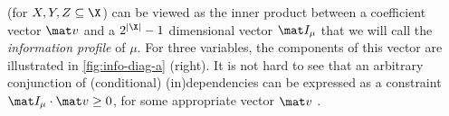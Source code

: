 (for $X,Y,Z \subseteq \X$)
can be viewed as the inner product between a coefficient vector $\mat v$
and a $2^{|\X|}-1$ dimensional vector $\mat I_\mu$ that we will call the \emph{information profile} of $\mu$. For three variables, the components of this vector are illustrated in 
\cref{fig:info-diag-a} (right).
%
It is not hard to see that an arbitrary conjunction of (conditional) (in)dependencies 
can be expressed as
a constraint $\mat I_\mu \cdot \mat v \ge 0$, for 
some appropriate vector $\mat v$
\unskip.


